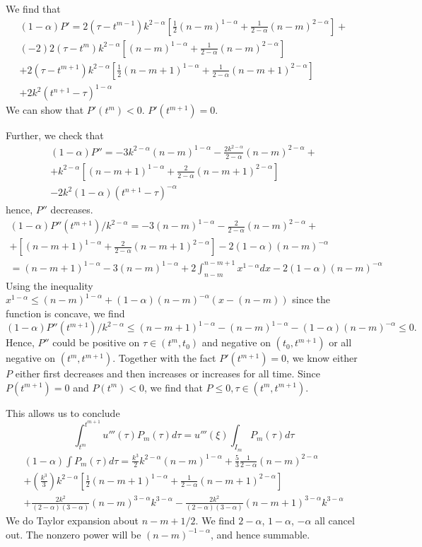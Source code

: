 \documentclass[11pt]{article}
\begin{document}
We find that 
\begin{multline*}
(1-\alpha)P'=2(\tau-t^{m-1})k^{2-\alpha}[\frac{1}{2}(n-m)^{1-\alpha}+\frac{1}{2-\alpha}(n-m)^{2-\alpha}]+\\
(-2)2(\tau-t^m)k^{2-\alpha}[(n-m)^{1-\alpha}+\frac{1}{2-\alpha}(n-m)^{2-\alpha}]\\
+2(\tau-t^{m+1})k^{2-\alpha}[\frac{1}{2}(n-m+1)^{1-\alpha}+\frac{1}{2-\alpha}(n-m+1)^{2-\alpha}]\\
+2k^2(t^{n+1}-\tau)^{1-\alpha}
\end{multline*}
We can show that $P'(t^m)<0$. $P'(t^{m+1})=0$. 

Further, we check that
\begin{multline*}
(1-\alpha)P''=
-3k^{2-\alpha}(n-m)^{1-\alpha}-\frac{2k^{2-\alpha}}{2-\alpha}(n-m)^{2-\alpha}+\\
+k^{2-\alpha}[(n-m+1)^{1-\alpha}+\frac{2}{2-\alpha}(n-m+1)^{2-\alpha}]\\
-2k^2(1-\alpha)(t^{n+1}-\tau)^{-\alpha}
\end{multline*}
hence, $P''$ decreases.  
\begin{multline*}
(1-\alpha)P''(t^{m+1})/k^{2-\alpha}=
-3(n-m)^{1-\alpha}-\frac{2}{2-\alpha}(n-m)^{2-\alpha}+\\
+[(n-m+1)^{1-\alpha}+\frac{2}{2-\alpha}(n-m+1)^{2-\alpha}]
-2(1-\alpha)(n-m)^{-\alpha}\\
=(n-m+1)^{1-\alpha}-3(n-m)^{1-\alpha}
+2\int_{n-m}^{n-m+1}x^{1-\alpha}dx-2(1-\alpha)(n-m)^{-\alpha}
\end{multline*}
Using the inequality $x^{1-\alpha}\le (n-m)^{1-\alpha}+(1-\alpha)(n-m)^{-\alpha}(x-(n-m))$ since the function is concave, we find $$
(1-\alpha)P''(t^{m+1})/k^{2-\alpha}\le (n-m+1)^{1-\alpha}-(n-m)^{1-\alpha}
-(1-\alpha)(n-m)^{-\alpha}\le 0.
$$
Hence, $P''$ could be positive on $\tau\in (t^m, t_0)$ and negative on $(t_0, t^{m+1})$ or all negative on $(t^m, t^{m+1})$. Together with the fact $P'(t^{m+1})=0$, we know either $P$ either first decreases and then increases or increases for all time. Since $P(t^{m+1})=0$ and $P(t^m)<0$, we find that $P\le 0,\tau\in (t^m, t^{m+1})$.

This allows us to conclude $$
\int_{t^m}^{t^{m+1}}u'''(\tau)P_m(\tau)d\tau
=u'''(\xi) \int_{I_m}P_m(\tau)d\tau
$$
\begin{multline*}
(1-\alpha)\int P_m(\tau)d\tau=\frac{k^3}{2}k^{2-\alpha}(n-m)^{1-\alpha}+
\frac{5}{3}\frac{1}{2-\alpha}(n-m)^{2-\alpha}\\
+(\frac{k^3}{3})k^{2-\alpha}[\frac{1}{2}(n-m+1)^{1-\alpha}+\frac{1}{2-\alpha}(n-m+1)^{2-\alpha}]\\
+\frac{2k^2}{(2-\alpha)(3-\alpha)}(n-m)^{3-\alpha}k^{3-\alpha}
-\frac{2k^2}{(2-\alpha)(3-\alpha)}(n-m+1)^{3-\alpha}k^{3-\alpha}
\end{multline*}
We do Taylor expansion about $n-m+1/2$. We find $2-\alpha$, $1-\alpha$, $-\alpha$ all cancel out. 
The nonzero power will be $(n-m)^{-1-\alpha}$, and hence summable.
\end{document}
